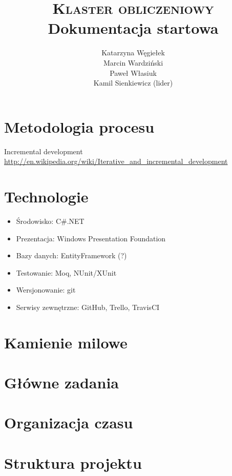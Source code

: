 \documentclass[a4paper]{article}
\title{\textsc{Klaster obliczeniowy}\\Dokumentacja startowa}
\author{Katarzyna Węgiełek\\Marcin Wardziński\\Paweł Własiuk\\Kamil Sienkiewicz (lider)}
\begin{document}
	\maketitle
	
	\section{Metodologia procesu}
	Incremental development \url{http://en.wikipedia.org/wiki/Iterative_and_incremental_development}
	\section{Technologie}
	
	\begin{itemize}
		\item Środowisko: C\#.NET
		\item Prezentacja: Windows Presentation Foundation
		\item Bazy danych: EntityFramework (?)
		\item Testowanie: Moq, NUnit/XUnit
		\item Wersjonowanie: git
		\item Serwisy zewnętrzne: GitHub, Trello, TravisCI
	\end{itemize}
	
	\section{Kamienie milowe}	
	\section{Główne zadania}
	\section{Organizacja czasu}
	\section{Struktura projektu}
	
\end{document}
